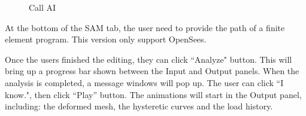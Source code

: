 \begin{figure}[!htbp]
  \centering 

  \caption{Call AI}
  \label{fig:colors}
\end{figure}

At the bottom of the SAM tab, the user need to provide the path of a finite element program. 
This version only support OpenSees. 

Once the users finished the editing, they can click ``Analyze" button. 
This will bring up a progress bar shown between the Input and Output panels.
When the analysis is completed, a message windows will pop up. The user can click ``I know.", then click ``Play'' button.
The animations will start in the Output panel, including:
the deformed mesh, the hysteretic curves and the load history. 

